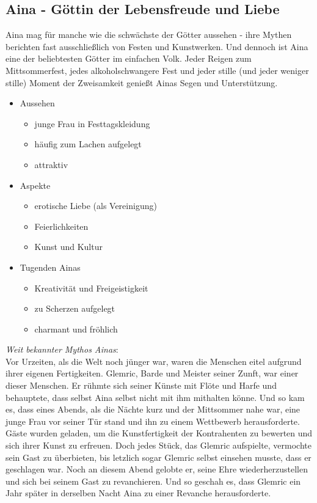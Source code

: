 \subsection{\textbf{Aina} - Göttin der Lebensfreude und Liebe}
Aina mag für manche wie die schwächste der Götter aussehen - ihre Mythen berichten fast ausschließlich von Festen und Kunstwerken. Und dennoch ist Aina eine der beliebtesten 
Götter im einfachen Volk. Jeder Reigen zum Mittsommerfest, jedes alkoholschwangere Fest und jeder stille (und jeder weniger stille) Moment der Zweisamkeit genießt Ainas Segen 
und Unterstützung.\\
\begin{itemize}
	\item Aussehen 
	\begin{itemize}
		\item junge Frau in Festtagskleidung
		\item häufig zum Lachen aufgelegt
		\item attraktiv 
	\end{itemize}
	\item Aspekte
	\begin{itemize}
		\item erotische Liebe (als Vereinigung)
		\item Feierlichkeiten
		\item Kunst und Kultur
	\end{itemize}
	\item Tugenden Ainas
	\begin{itemize}
		\item Kreativität und Freigeistigkeit
		\item zu Scherzen aufgelegt
		\item charmant und fröhlich
	\end{itemize}
\end{itemize}
\textit{Weit bekannter Mythos Ainas}:\\
Vor Urzeiten, als die Welt noch jünger war, waren die Menschen eitel aufgrund ihrer eigenen Fertigkeiten. Glemric, Barde und Meister seiner Zunft, war einer dieser Menschen. 
Er rühmte sich seiner Künste mit Flöte und Harfe und behauptete, dass selbst Aina selbst nicht mit ihm mithalten könne. Und so kam es, dass eines Abends, als die Nächte 
kurz und der Mittsommer nahe war, eine junge Frau vor seiner Tür stand und ihn zu einem Wettbewerb herausforderte. Gäste wurden geladen, um die Kunstfertigkeit der Kontrahenten 
zu bewerten und sich ihrer Kunst zu erfreuen. Doch jedes Stück, das Glemric aufspielte, vermochte sein Gast zu überbieten, bis letzlich sogar Glemric selbst einsehen musste, 
dass er geschlagen war. Noch an diesem Abend gelobte er, seine Ehre wiederherzustellen und sich bei seinem Gast zu revanchieren. Und so geschah es, dass Glemric ein Jahr später 
in derselben Nacht Aina zu einer Revanche herausforderte. 

